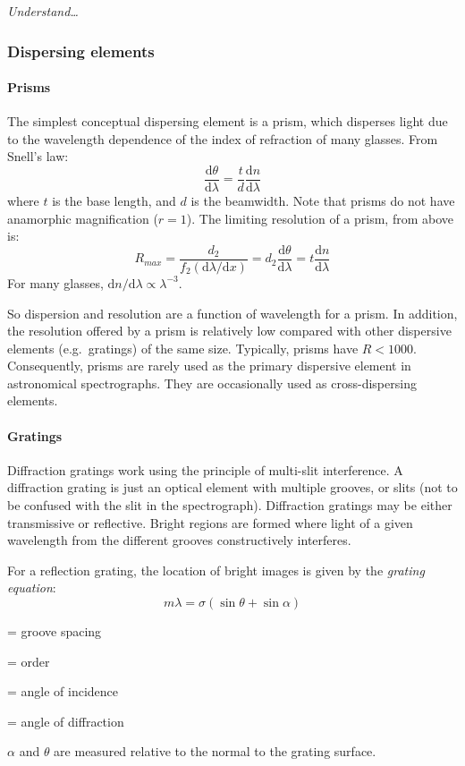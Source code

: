 \documentclass[12pt]{article}
\newcommand{\test}[1]{%
    \begin{center}
        {\parbox{0.9\textwidth}{\textit{\small#1}}}
    \end{center}}
\begin{document}
\test{Understand\ldots}

\subsubsection{Dispersing elements}
\paragraph{Prisms}
The simplest conceptual dispersing element is a prism, which disperses light
due to the wavelength dependence of the index of refraction of many glasses.
From Snell's law:
\[
    \frac{\mathrm{d}\theta}{\mathrm{d}\lambda}
    = \frac{t}{d} \frac{\mathrm{d}n}{\mathrm{d}\lambda}
    \]
where $t$ is the base length, and $d$ is the beamwidth. Note that prisms
do not have anamorphic magnification ($r=1$). The limiting resolution
of a prism, from above is:
\[
    R_{max}
    = \frac{d_{2}}{f_{2}(\mathrm{d}\lambda/\mathrm{d}x)}
    = d_{2}\frac{\mathrm{d}\theta}{\mathrm{d}\lambda}
    = t\frac{\mathrm{d}n}{\mathrm{d}\lambda}
    \]
For many glasses, $\mathrm{d}n/\mathrm{d}\lambda \propto \lambda^{-3}$.

So dispersion and resolution are a function of wavelength for a prism.
In addition, the resolution offered by a prism is relatively low
compared with other dispersive elements (e.g.\ gratings) of the same
size. Typically, prisms have $R < 1000$. Consequently, prisms are rarely
used as the primary dispersive element in astronomical spectrographs.
They are occasionally used as cross-dispersing elements.

\paragraph{Gratings}
Diffraction gratings work using the principle of multi-slit interference. A
diffraction grating is just an optical element with multiple grooves, or slits
(not to be confused with the slit in the spectrograph). Diffraction gratings
may be either transmissive or reflective. Bright regions are formed where light
of a given wavelength from the different grooves constructively interferes.

For a reflection grating, the location of bright images is given by the
\textit{grating equation}:
\[
    m\lambda = \sigma\left(\sin\theta + \sin\alpha\right)
    \]
\begin{description}[align=right, labelindent=0.5in]
    \item [$\sigma$] = groove spacing
    \item [$m$] = order
    \item [$\alpha$] = angle of incidence
    \item [$\theta$] = angle of diffraction
\end{description}
$\alpha$ and $\theta$ are measured relative to the normal to the grating
surface.
\end{document}
